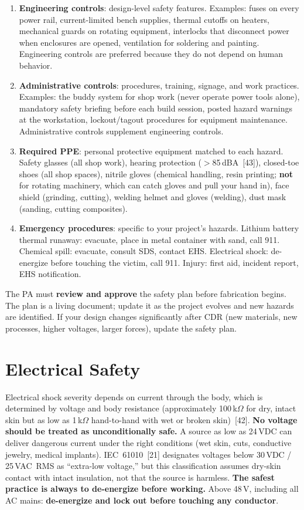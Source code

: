 \begin{enumerate}[nosep,leftmargin=1.5em]
\item \textbf{Engineering controls}: design-level safety features. Examples: fuses on every power rail, current-limited bench supplies, thermal cutoffs on heaters, mechanical guards on rotating equipment, interlocks that disconnect power when enclosures are opened, ventilation for soldering and painting. Engineering controls are preferred because they do not depend on human behavior.
\item \textbf{Administrative controls}: procedures, training, signage, and work practices. Examples: the buddy system for shop work (never operate power tools alone), mandatory safety briefing before each build session, posted hazard warnings at the workstation, lockout/tagout procedures for equipment maintenance. Administrative controls supplement engineering controls.
\item \textbf{Required PPE}: personal protective equipment matched to each hazard. Safety glasses (all shop work), hearing protection ($>$85\,dBA~[43]), closed-toe shoes (all shop spaces), nitrile gloves (chemical handling, resin printing; \textbf{not} for rotating machinery, which can catch gloves and pull your hand in), face shield (grinding, cutting), welding helmet and gloves (welding), dust mask (sanding, cutting composites).
\item \textbf{Emergency procedures}: specific to your project's hazards. Lithium battery thermal runaway: evacuate, place in metal container with sand, call 911. Chemical spill: evacuate, consult SDS, contact EHS. Electrical shock: de-energize before touching the victim, call 911. Injury: first aid, incident report, EHS notification.
\end{enumerate}

The PA must \textbf{review and approve} the safety plan before fabrication begins. The plan is a living document; update it as the project evolves and new hazards are identified. If your design changes significantly after CDR (new materials, new processes, higher voltages, larger forces), update the safety plan.

\section{Electrical Safety}
Electrical shock severity depends on current through the body, which is determined by voltage and body resistance (approximately 100\,k$\Omega$ for dry, intact skin but as low as 1\,k$\Omega$ hand-to-hand with wet or broken skin)~[42]. \textbf{No voltage should be treated as unconditionally safe.} A source as low as 24\,VDC can deliver dangerous current under the right conditions (wet skin, cuts, conductive jewelry, medical implants). IEC~61010~[21] designates voltages below 30\,VDC / 25\,VAC~RMS as ``extra-low voltage,'' but this classification assumes dry-skin contact with intact insulation, not that the source is harmless. \textbf{The safest practice is always to de-energize before working.} Above 48\,V, including all AC mains: \textbf{de-energize and lock out before touching any conductor}.

